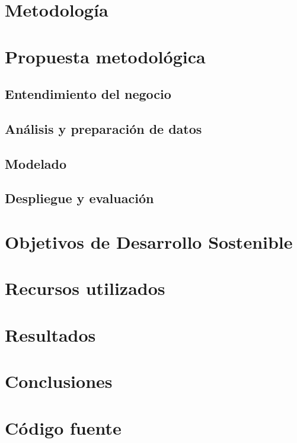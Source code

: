 \documentclass[journal]{IEEEtran}
\begin{document}
    \section{Metodología}

    \section{Propuesta metodológica}

        \subsection{Entendimiento del negocio}

        \subsection{Análisis y preparación de datos}

        \subsection{Modelado}


        \subsection{Despliegue y evaluación}


    \section{Objetivos de Desarrollo Sostenible}


    \section{Recursos utilizados}


    \section{Resultados}

    \section{Conclusiones}


    \appendices

    \section{Código fuente}\label{code:repo}
\end{document}
